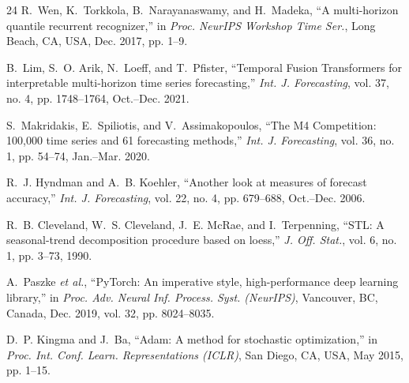 \documentclass[journal]{IEEEtran}
\begin{document}
\begin{thebibliography}{24}
R.~Wen, K.~Torkkola, B.~Narayanaswamy, and H.~Madeka, ``A multi-horizon quantile recurrent recognizer,'' in \textit{Proc. NeurIPS Workshop Time Ser.}, Long Beach, CA, USA, Dec. 2017, pp. 1--9.

B.~Lim, S.~O. Arik, N.~Loeff, and T.~Pfister, ``Temporal Fusion Transformers for interpretable multi-horizon time series forecasting,'' \textit{Int. J. Forecasting}, vol. 37, no. 4, pp. 1748--1764, Oct.--Dec. 2021.

S.~Makridakis, E.~Spiliotis, and V.~Assimakopoulos, ``The M4 Competition: 100,000 time series and 61 forecasting methods,'' \textit{Int. J. Forecasting}, vol. 36, no. 1, pp. 54--74, Jan.--Mar. 2020.

R.~J. Hyndman and A.~B. Koehler, ``Another look at measures of forecast accuracy,'' \textit{Int. J. Forecasting}, vol. 22, no. 4, pp. 679--688, Oct.--Dec. 2006.

R.~B. Cleveland, W.~S. Cleveland, J.~E. McRae, and I.~Terpenning, ``STL: A seasonal-trend decomposition procedure based on loess,'' \textit{J. Off. Stat.}, vol. 6, no. 1, pp. 3--73, 1990.

A.~Paszke \textit{et al.}, ``PyTorch: An imperative style, high-performance deep learning library,'' in \textit{Proc. Adv. Neural Inf. Process. Syst. (NeurIPS)}, Vancouver, BC, Canada, Dec. 2019, vol. 32, pp. 8024--8035.

D.~P. Kingma and J.~Ba, ``Adam: A method for stochastic optimization,'' in \textit{Proc. Int. Conf. Learn. Representations (ICLR)}, San Diego, CA, USA, May 2015, pp. 1--15.

\end{thebibliography}
\end{document}
